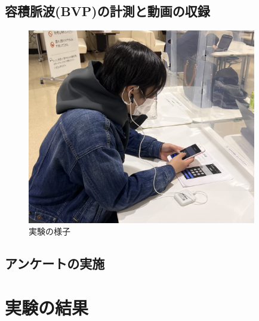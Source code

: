 \subsection{容積脈波(BVP)の計測と動画の収録}

\begin{figure}[htbp]
  \begin{minipage}{\hsize}
    \begin{center}
       \includegraphics[width=100mm]{img/experience.jpg}
    \end{center}
    \caption{実験の様子}
    \label{fig:observe}
  \end{minipage}
\end{figure}

\subsection{アンケートの実施}
\cite{stressquestionare}

\section{実験の結果}

